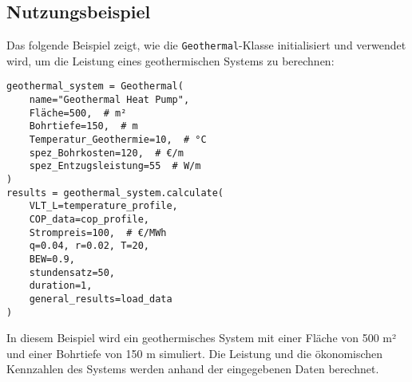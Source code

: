 \subsection{Nutzungsbeispiel}
Das folgende Beispiel zeigt, wie die \texttt{Geothermal}-Klasse initialisiert und verwendet wird, um die Leistung eines geothermischen Systems zu berechnen:

\begin{verbatim}
geothermal_system = Geothermal(
    name="Geothermal Heat Pump",
    Fläche=500,  # m²
    Bohrtiefe=150,  # m
    Temperatur_Geothermie=10,  # °C
    spez_Bohrkosten=120,  # €/m
    spez_Entzugsleistung=55  # W/m
)
results = geothermal_system.calculate(
    VLT_L=temperature_profile, 
    COP_data=cop_profile, 
    Strompreis=100,  # €/MWh
    q=0.04, r=0.02, T=20, 
    BEW=0.9, 
    stundensatz=50, 
    duration=1, 
    general_results=load_data
)
\end{verbatim}
In diesem Beispiel wird ein geothermisches System mit einer Fläche von 500 m² und einer Bohrtiefe von 150 m simuliert. Die Leistung und die ökonomischen Kennzahlen des Systems werden anhand der eingegebenen Daten berechnet.
